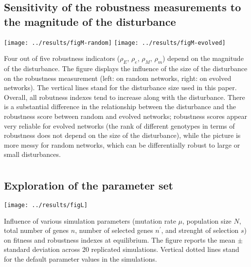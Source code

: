 \documentclass[a4paper]{article}
\newcommand{\earlyenv}{{\rho_E}}
\newcommand{\lateenv}{{\rho_e}}
\newcommand{\earlymut}{{\rho_M}}
\newcommand{\latemut}{{\rho_m}}
\begin{document}
\begin{appendices}
    \subsection*{Sensitivity of the robustness measurements to the magnitude of the disturbance}

	\texttt{[image: ../results/figM-random]} \texttt{[image: ../results/figM-evolved]}
	
	Four out of five robustness indicators ($\earlyenv$, $\lateenv$, $\earlymut$, $\latemut$) depend on the magnitude of the disturbance. The figure displays the influence of the size of the disturbance on the robustness measurement (left: on random networks, right: on evolved networks). The vertical lines stand for the disturbance size used in this paper. Overall, all robutness indexes tend to increase along with the disturbance. There is a substantial difference in the relationship between the disturbance and the robustness score between random and evolved networks; robustness scores appear very reliable for evolved networks (the rank of different genotypes in terms of robustness does not depend on the size of the disturbance), while the picture is more messy for random networks, which can be differentially robust to large or small disturbances. 


  \clearpage
  \section{}
    \label{supp:explo}
    \subsection*{Exploration of the parameter set}
	\begin{center}
	\texttt{[image: ../results/figL]} 
	\end{center}
	
	Influence of various simulation parameters (mutation rate $\mu$, population size $N$, total number of genes $n$, number of selected genes $n^\prime$, and strenght of selection $s$) on fitness and robustness indexes at equilibrium. The figure reports the mean $\pm$ standard deviation across 20 replicated simulations. Vertical dotted lines stand for the default parameter values in the simulations. 




\end{appendices}
\end{document}
